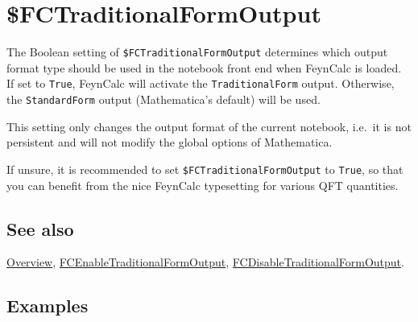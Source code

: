 \documentclass[../FeynCalcManual.tex]{subfiles}
\begin{document}
\hypertarget{dollarfctraditionalformoutput}{
\section{\$FCTraditionalFormOutput}\label{dollarfctraditionalformoutput}}

The Boolean setting of \texttt{\$FCTraditionalFormOutput} determines
which output format type should be used in the notebook front end when
FeynCalc is loaded. If set to \texttt{True}, FeynCalc will activate the
\texttt{TraditionalForm} output. Otherwise, the \texttt{StandardForm}
output (Mathematica's default) will be used.

This setting only changes the output format of the current notebook,
i.e.~it is not persistent and will not modify the global options of
Mathematica.

If unsure, it is recommended to set \texttt{\$FCTraditionalFormOutput}
to \texttt{True}, so that you can benefit from the nice FeynCalc
typesetting for various QFT quantities.

\subsection{See also}

\hyperlink{toc}{Overview},
\hyperlink{fcenabletraditionalformoutput}{FCEnableTraditionalFormOutput},
\hyperlink{fcdisabletraditionalformoutput}{FCDisableTraditionalFormOutput}.

\subsection{Examples}
\end{document}
